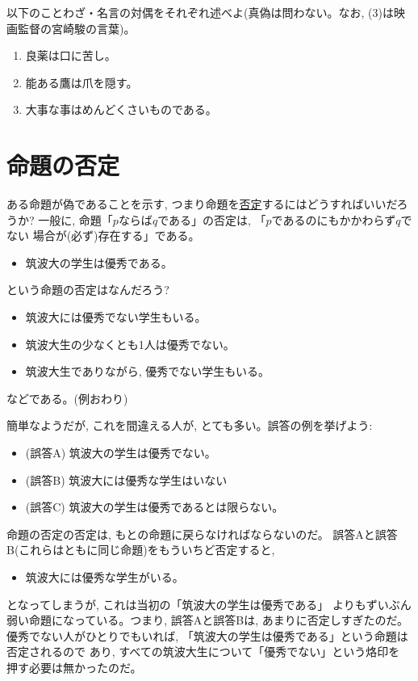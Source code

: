 \begin{q}\label{q:logic_taigu0} 以下のことわざ・名言の対偶をそれぞれ述べよ(真偽は問わない。なお, 
(3)は映画監督の宮崎駿の言葉)。
\begin{enumerate}
\item 良薬は口に苦し。
\item 能ある鷹は爪を隠す。
\item 大事な事はめんどくさいものである。
\end{enumerate}
\end{q}
\vv


\section{命題の否定}

ある命題が偽であることを示す, つまり命題を\underline{否定}するにはどうすればいいだろうか? 
一般に, 命題「$p$ならば$q$である」の否定は, 「$p$であるのにもかかわらず$q$でない
場合が(必ず)存在する」である。

\begin{exmpl}\label{exmpl:Utsukuba_good_nogood10}
\begin{itemize}
\item 筑波大の学生は優秀である。
\end{itemize}
という命題の否定はなんだろう?
\begin{itemize}
\item 筑波大には優秀でない学生もいる。
\item 筑波大生の少なくとも1人は優秀でない。
\item 筑波大生でありながら, 優秀でない学生もいる。
\end{itemize}
などである。(例おわり)\end{exmpl}

簡単なようだが, これを間違える人が, とても多い。誤答の例を挙げよう:
\begin{itemize}
\item (誤答A) 筑波大の学生は優秀でない。
\item (誤答B) 筑波大には優秀な学生はいない
\item (誤答C) 筑波大の学生は優秀であるとは限らない。
\end{itemize}
命題の否定の否定は, もとの命題に戻らなければならないのだ。
誤答Aと誤答B(これらはともに同じ命題)をもういちど否定すると, 
\begin{itemize}
\item 筑波大には優秀な学生がいる。
\end{itemize}
となってしまうが, これは当初の「筑波大の学生は優秀である」
よりもずいぶん弱い命題になっている。つまり, 誤答Aと誤答Bは, 
あまりに否定しすぎたのだ。優秀でない人がひとりでもいれば, 
「筑波大の学生は優秀である」という命題は否定されるので
あり, すべての筑波大生について「優秀でない」という烙印を
押す必要は無かったのだ。

